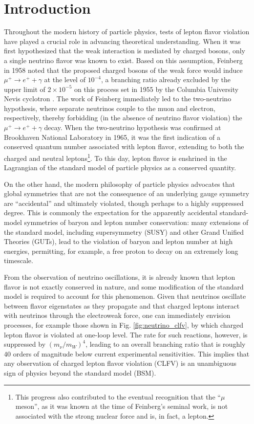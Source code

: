\documentclass{book}[letterpaper,12pt]
\begin{document}
\chapter{Introduction}
\thispagestyle{headings}
Throughout the modern history of particle physics, tests of lepton flavor violation have played a crucial role in advancing theoretical understanding. When it was first hypothesized that the weak interaction is mediated by charged bosons, only a single neutrino flavor was known to exist. Based on this assumption, Feinberg \cite{PhysRev.110.1482} in 1958 noted that the proposed charged bosons of the weak force would induce $\mu^+\rightarrow e^+ + \gamma$ at the level of $10^{-4}$, a branching ratio already excluded by the upper limit of $2\times 10^{-5}$ on this process set in 1955 by the Columbia University Nevis cyclotron \cite{PhysRev.98.240}. The work of Feinberg immediately led to the two-neutrino hypothesis, where separate neutrinos couple to the muon and electron, respectively, thereby forbidding (in the absence of neutrino flavor violation) the $\mu^+\rightarrow e^+ + \gamma$ decay. When the two-neutrino hypothesis was confirmed at Brookhaven National Laboratory \cite{PhysRevLett.9.36} in 1965, it was the first indication of a conserved quantum number associated with lepton flavor, extending to both the charged and neutral leptons\footnote{This progress also contributed to the eventual recognition that the ``$\mu$ meson'', as it was known at the time of Feinberg's seminal work, is not associated with the strong nuclear force and is, in fact, a lepton.}. To this day, lepton flavor is enshrined in the Lagrangian of the standard model of particle physics as a conserved quantity. 

On the other hand, the modern philosophy of particle physics advocates that global symmetries that are not the consequence of an underlying gauge symmetry are ``accidental'' and ultimately violated, though perhaps to a highly suppressed degree. This is commonly the expectation for the apparently accidental standard-model symmetries of baryon and lepton number conservation: many extensions of the standard model, including supersymmetry (SUSY) and other Grand Unified Theories (GUTs), lead to the violation of baryon and lepton number at high energies, permitting, for example, a free proton to decay on an extremely long timescale. 

From the observation of neutrino oscillations, it is already known that lepton flavor is not exactly conserved in nature, and some modification of the standard model is required to account for this phenomenon. Given that neutrinos oscillate between flavor eigenstates as they propagate and that charged leptons interact with neutrinos through the electroweak force, one can immediately envision processes, for example those shown in Fig. \ref{fig:neutrino_clfv}, by which charged lepton flavor is violated at one-loop level. The rate for such reactions, however, is suppressed by $(m_{\nu}/m_W)^4$, leading to an overall branching ratio that is roughly $40$ orders of magnitude below current experimental sensitivities. This implies that any observation of charged lepton flavor violation (CLFV) is an unambiguous sign of physics beyond the standard model (BSM).
\end{document}
